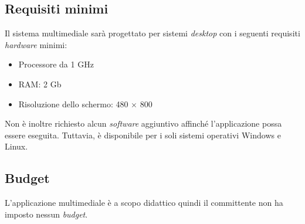 \subsection{Requisiti minimi}
Il sistema multimediale sarà progettato per sistemi \textit{desktop} con i seguenti requisiti \emph{hardware} minimi:
\begin{itemize}
	\item Processore da 1 GHz
	\item RAM: 2 Gb
	\item Risoluzione dello schermo: 480 $\times$ 800
\end{itemize}
Non è inoltre richiesto alcun \textit{software} aggiuntivo affinché l'applicazione possa essere eseguita. Tuttavia, \ProjectTitle{} è disponibile per i soli sistemi operativi \textsf{Windows} e \textsf{Linux}.

\subsection{Budget}
L'applicazione multimediale è a scopo didattico quindi il committente non ha imposto nessun \emph{budget}.